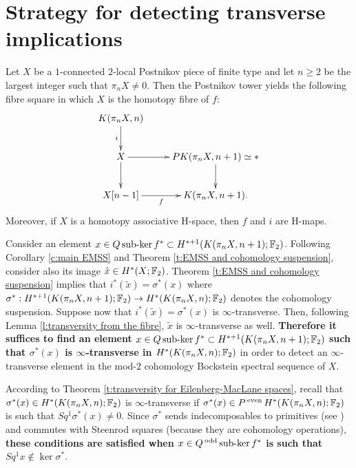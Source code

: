 \section{Strategy for detecting transverse implications}\label{section:strategy}

Let $X$ be a $1$-connected $2$-local Postnikov piece of finite type and let $n\geq2$ be the largest integer such that $\pi_n X\not=0$. Then the Postnikov tower yields the following fibre square in which $X$ is the homotopy fibre of $f$:
$$\xymatrix{
K(\pi_n X,n)\ar[d]_i\\
X\ar[r]\ar[d] &PK(\pi_n X,n+1)\simeq{*}\ar[d]\\
X[n-1]\ar[r]_-f &K(\pi_n X,n+1).
}$$
Moreover, if $X$ is a homotopy associative H-space, then $f$ and $i$ are H-maps. 

Consider an element $x\in Q\operatorname{sub-ker} f^*\subset H^{*+1}(K(\pi_nX,n+1);\mathbb{F}_2)$. Following Corollary \ref{c:main EMSS} and Theorem \ref{t:EMSS and cohomology suspension}, consider also its image $\tilde{x}\in H^*(X;\mathbb{F}_2)$. Theorem \ref{t:EMSS and cohomology suspension} implies that $i^*(\tilde{x})=\sigma^*(x)$ where $\sigma^*:H^{*+1}(K(\pi_n X,n+1);\mathbb{F}_2)\to H^*(K(\pi_n X,n);\mathbb{F}_2)$ denotes the cohomology suspension. Suppose now that $i^*(\tilde{x})=\sigma^*(x)$ is $\infty$-transverse. Then, following Lemma \ref{l:transversity from the fibre}, $\tilde{x}$ is $\infty$-transverse as well. {\bf Therefore it suffices to find an element $x\in Q\operatorname{sub-ker} f^*\subset H^{*+1}(K(\pi_nX,n+1);\mathbb{F}_2)$ such that $\sigma^*(x)$ is $\infty$-transverse in $H^*(K(\pi_n X,n);\mathbb{F}_2)$} in order to detect an $\infty$-transverse element in the mod-$2$ cohomology Bockstein spectral sequence of $X$. 

According to Theorem \ref{t:transversity for Eilenberg-MacLane spaces}, recall that $\sigma^*(x)\in H^*(K(\pi_n X,n);\mathbb{F}_2)$ is $\infty$-transverse if $\sigma^*(x)\in P\operatorname{^{even}} H^*(K(\pi_n X,n);\mathbb{F}_2)$ is such that $Sq^1\sigma^*(x)\not=0$. Since $\sigma^*$ sends indecomposables to primitives (see \cite[pp. 210-211]{Ka88}) and commutes with Steenrod squares (because they are cohomology operations), {\bf these conditions are satisfied when $x\in Q\operatorname{^{odd}}\operatorname{sub-ker} f^*$ is such that $Sq^1x\not\in\ker\sigma^*$}. 

\endinput